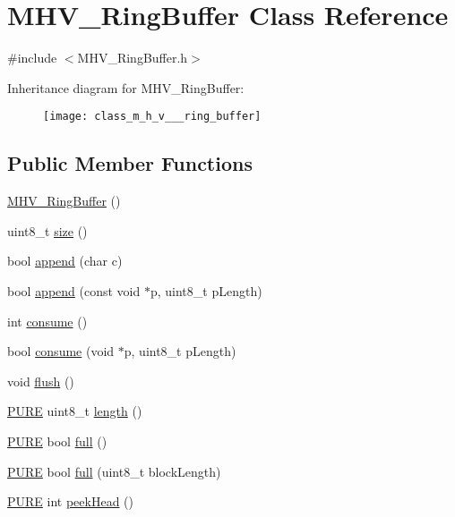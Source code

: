 \hypertarget{class_m_h_v___ring_buffer}{\section{M\-H\-V\-\_\-\-Ring\-Buffer Class Reference}
\label{class_m_h_v___ring_buffer}
}


{\ttfamily \#include $<$M\-H\-V\-\_\-\-Ring\-Buffer.\-h$>$}

Inheritance diagram for M\-H\-V\-\_\-\-Ring\-Buffer\-:\begin{figure}[H]
\begin{center}
\leavevmode
\texttt{[image: class\_m\_h\_v\_\_\_ring\_buffer]}
\end{center}
\end{figure}
\subsection*{Public Member Functions}
\begin{DoxyCompactItemize}
\item 
\hyperlink{class_m_h_v___ring_buffer_aa284a4e91f52b4c58bd7866e8502ce9b}{M\-H\-V\-\_\-\-Ring\-Buffer} ()
\item 
uint8\-\_\-t \hyperlink{class_m_h_v___ring_buffer_a2935a046213f670d986a82a25e2a0fc3}{size} ()
\item 
bool \hyperlink{class_m_h_v___ring_buffer_ae9fb1751555f666d4d7dd9ff5b8d4684}{append} (char c)
\item 
bool \hyperlink{class_m_h_v___ring_buffer_a71e1ef04975d8884fc70d6ea80f6c22f}{append} (const void $\ast$p, uint8\-\_\-t p\-Length)
\item 
int \hyperlink{class_m_h_v___ring_buffer_addec99c97519a0241e7d4be65e432df6}{consume} ()
\item 
bool \hyperlink{class_m_h_v___ring_buffer_aaa70dae0a8ceb6da0506198b60f0d394}{consume} (void $\ast$p, uint8\-\_\-t p\-Length)
\item 
void \hyperlink{class_m_h_v___ring_buffer_aa9e34685f3881cc967493e3e8c9b839e}{flush} ()
\item 
\hyperlink{_m_h_v__io_8h_acd42770aecb025cfac170d4d3ace4544}{P\-U\-R\-E} uint8\-\_\-t \hyperlink{class_m_h_v___ring_buffer_a0f83a4149c40b8ab7eca9712b37d14fe}{length} ()
\item 
\hyperlink{_m_h_v__io_8h_acd42770aecb025cfac170d4d3ace4544}{P\-U\-R\-E} bool \hyperlink{class_m_h_v___ring_buffer_a72eb6f83c4ddb6a23275cdd3f1030d07}{full} ()
\item 
\hyperlink{_m_h_v__io_8h_acd42770aecb025cfac170d4d3ace4544}{P\-U\-R\-E} bool \hyperlink{class_m_h_v___ring_buffer_aaaa5e7fff0c1b7e748c4278096a8b5b1}{full} (uint8\-\_\-t block\-Length)
\item 
\hyperlink{_m_h_v__io_8h_acd42770aecb025cfac170d4d3ace4544}{P\-U\-R\-E} int \hyperlink{class_m_h_v___ring_buffer_a4537605236df3aa7c91fff9d95d50d05}{peek\-Head} ()
\end{DoxyCompactItemize}

